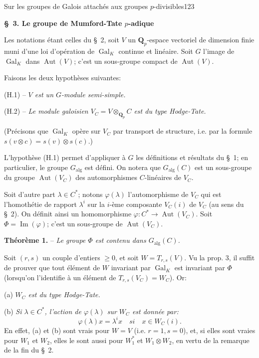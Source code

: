 \begin{center}Sur les groupes de Galois attachés aux groupes $p$-divisibles\hfill123\end{center}

\begin{center}\textbf{\S\ 3. Le groupe de Mumford-Tate $p$-adique}\end{center}

Les notations étant celles du \S\ 2, soit $V$ un $\mathbf Q_p$-espace vectoriel de dimension finie muni d'une loi d'opération de $\operatorname{Gal}_K$ continue et linéaire. Soit $G$ l'image de $\operatorname{Gal}_K$ dans $\operatorname{Aut}(V)$; c'est un sous-groupe compact de $\operatorname{Aut}(V)$.

Faisons les deux hypothèses suivantes:

(H.1) -- \textit{$V$ est un $G$-module semi-simple.}

(H.2) -- \textit{Le module galoisien $V_C=V\otimes_{\mathbf Q_p}C$ est du type Hodge-Tate.}

(Précisons que $\operatorname{Gal}_K$ opère sur $V_C$ par transport de structure, i.e. par la formule $s(v\otimes c)=s(v)\otimes s(c)$.)

L'hypothèse (H.1) permet d'appliquer à $G$ les définitions et résultats du \S\ 1; en particulier, le groupe $G_{\mathrm{alg}}$ est défini. On notera que $G_{\mathrm{alg}}(C)$ est un sous-groupe du groupe $\operatorname{Aut}(V_C)$ des automorphismes $C$-linéaires de $V_C$.

Soit d'autre part $\lambda\in C^*$; notons $\varphi(\lambda)$ l'automorphisme de $V_C$ qui est l'homothétie de rapport $\lambda^i$ sur la $i$-ème composante $V_C(i)$ de $V_C$ (au sens du \S\ 2). On définit ainsi un homomorphisme $\varphi:C^*\to\operatorname{Aut}(V_C)$. Soit $\Phi=\operatorname{Im}(\varphi)$; c'est un sous-groupe de $\operatorname{Aut}(V_C)$.

\textbf{Théorème 1.} -- \textit{Le groupe $\Phi$ est contenu dans $G_{\mathrm{alg}}(C)$.}

Soit $(r,s)$ un couple d'entiers $\geq0$, et soit $W=T_{r,s}(V)$. Vu la prop. 3, il suffit de prouver que tout élément de $W$ invariant par $\operatorname{Gal}_K$ est invariant par $\Phi$ (lorsqu'on l'identifie à un élément de $T_{r,s}(V_C)=W_C$). Or:

(a) \textit{$W_C$ est du type Hodge-Tate.}

(b) \textit{Si $\lambda\in C^*$, l'action de $\varphi(\lambda)$ sur $W_C$ est donnée par:}
\[
\varphi(\lambda)x=\lambda^i x\quad\textit{si}\quad x\in W_C(i).
\]
En effet, (a) et (b) sont vrais pour $W=V$ (i.e. $r=1,s=0$), et, si elles sont vraies pour $W_1$ et $W_2$, elles le sont aussi pour $W_1^*$ et $W_1\otimes W_2$, en vertu de la remarque de la fin du \S\ 2.

